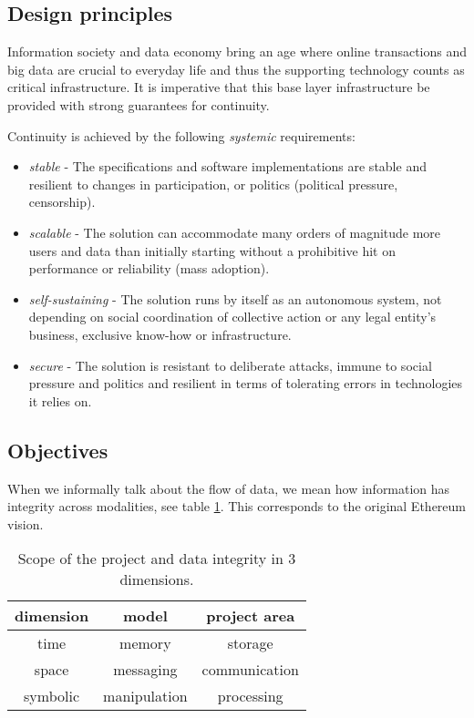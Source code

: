 \subsection{Design principles \statusorange}\label{sec:design-principles}
 

Information society  and data economy bring an age where online transactions and big data are crucial to everyday life and thus the supporting technology counts as critical infrastructure. It is imperative that this base layer infrastructure be provided with strong guarantees for continuity. 

Continuity is achieved by the following \emph{systemic} requirements:

\begin{itemize}
\item \emph{stable} - The specifications and software implementations are stable and resilient to changes in participation, or politics (political pressure, censorship).
\item \emph{scalable} - The solution can accommodate many orders of magnitude more users and data than initially starting without a prohibitive hit on performance or reliability (mass adoption).
\item \emph{self-sustaining} - The solution runs by itself as an autonomous system, not depending on social coordination of collective action or any legal entity's business, exclusive know-how or infrastructure.   
\item \emph{secure} - The solution is resistant to deliberate attacks, immune to  social pressure  and politics and resilient in terms of tolerating errors in technologies it relies on. 
\end{itemize}





\subsection{Objectives \statusyellow}\label{sec:objectives}


When we informally talk about the flow of data, we mean how information has  integrity across modalities, see table \ref{tab:scope}. This corresponds to the original Ethereum vision.

\begin{table}[htb]
\centering
\begin{tabular}{c|c|c}
dimension & model & project area\\\hline
%
time & memory & storage \\
space & messaging & communication \\
symbolic & manipulation & processing \\
\end{tabular}
\caption{Scope of the project and data integrity in 3 dimensions.}
\label{tab:scope}
\end{table}

